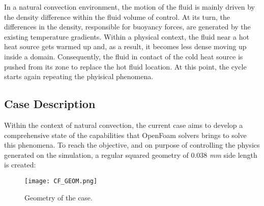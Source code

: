 In a natural convection environment, the motion of the fluid is mainly driven by the density difference within the fluid volume of control. At its turn, the differences in the density, responsible for buoyancy forces, are generated by the existing temperature gradients. Within a physical context, the fluid near a hot heat source gets warmed up and, as a result, it becomes less dense moving up inside a domain. Consequently, the fluid in contact of the cold heat source is pushed from its zone to replace the hot fluid location. At this point, the cycle starts again repeating the phyisical phenomena.

\subsection{Case Description}
Within the context of natural convection, the current case aims to develop a comprehensive state of the capabilities that OpenFoam solvers brings to solve this phenomena. To reach the objective, and on purpose of controlling the physics generated on the simulation, a regular squared geometry of 0.038 \textit{mm} side length is created:

\begin{figure}[h!]
	\centering
	\texttt{[image: CF\_GEOM.png]}	
	\label{3.2fig}
	\caption{Geometry of the case.}
\end{figure} 

